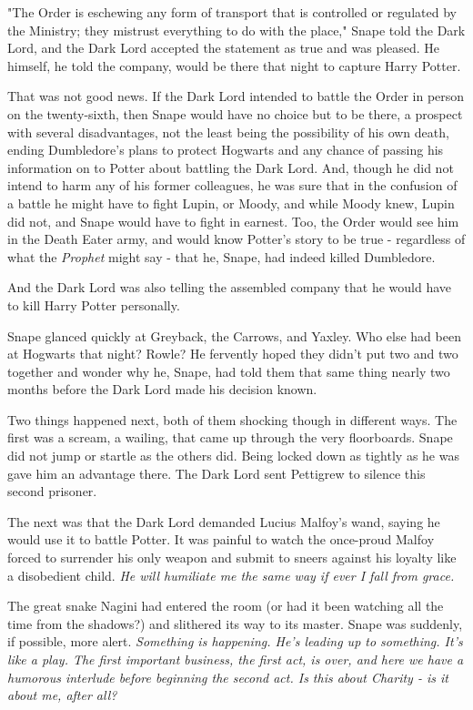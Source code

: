 "The Order is eschewing any form of transport that is controlled or regulated by the Ministry; they mistrust everything to do with the place," Snape told the Dark Lord, and the Dark Lord accepted the statement as true and was pleased. He himself, he told the company, would be there that night to capture Harry Potter.

That was not good news. If the Dark Lord intended to battle the Order in person on the twenty-sixth, then Snape would have no choice but to be there, a prospect with several disadvantages, not the least being the possibility of his own death, ending Dumbledore's plans to protect Hogwarts and any chance of passing his information on to Potter about battling the Dark Lord. And, though he did not intend to harm any of his former colleagues, he was sure that in the confusion of a battle he might have to fight Lupin, or Moody, and while Moody knew, Lupin did not, and Snape would have to fight in earnest. Too, the Order would see him in the Death Eater army, and would know Potter's story to be true - regardless of what the \emph{Prophet} might say - that he, Snape, had indeed killed Dumbledore.

And the Dark Lord was also telling the assembled company that he would have to kill Harry Potter personally.

Snape glanced quickly at Greyback, the Carrows, and Yaxley. Who else had been at Hogwarts that night? Rowle? He fervently hoped they didn't put two and two together and wonder why he, Snape, had told them that same thing nearly two months before the Dark Lord made his decision known.

Two things happened next, both of them shocking though in different ways. The first was a scream, a wailing, that came up through the very floorboards. Snape did not jump or startle as the others did. Being locked down as tightly as he was gave him an advantage there. The Dark Lord sent Pettigrew to silence this second prisoner.

The next was that the Dark Lord demanded Lucius Malfoy's wand, saying he would use it to battle Potter. It was painful to watch the once-proud Malfoy forced to surrender his only weapon and submit to sneers against his loyalty like a disobedient child. \emph{He will humiliate me the same way if ever I fall from grace.}

The great snake Nagini had entered the room (or had it been watching all the time from the shadows?) and slithered its way to its master. Snape was suddenly, if possible, more alert. \emph{Something is happening. He's leading up to something. It's like a play. The first important business, the first act, is over, and here we have a humorous interlude before beginning the second act. Is this about Charity - is it about me, after all?}

